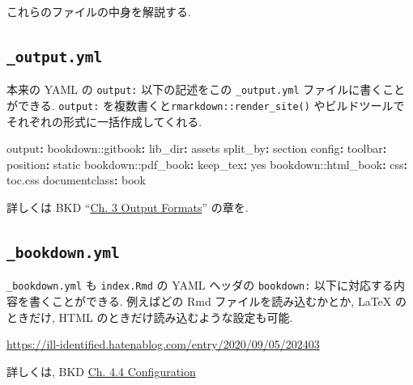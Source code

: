 \documentclass[
]{bxjsbook}
\newenvironment{Shaded}{\begin{snugshade}}{\end{snugshade}}
\newcommand{\AttributeTok}[1]{\textcolor[rgb]{0.77,0.63,0.00}{#1}}
\newcommand{\CharTok}[1]{\textcolor[rgb]{0.31,0.60,0.02}{#1}}
\newcommand{\FunctionTok}[1]{\textcolor[rgb]{0.00,0.00,0.00}{#1}}
\newcommand{\KeywordTok}[1]{\textcolor[rgb]{0.13,0.29,0.53}{\textbf{#1}}}
\theoremstyle{definition}
\theoremstyle{definition}
\theoremstyle{definition}
\theoremstyle{remark}
\begin{document}
これらのファイルの中身を解説する.

\hypertarget{output.yml}{%
\subsection{\texorpdfstring{\texttt{\_output.yml}}{\_output.yml}}\label{output.yml}}

本来の YAML の \texttt{output:} 以下の記述をこの \texttt{\_output.yml}
ファイルに書くことができる. \texttt{output:}
を複数書くと\texttt{rmarkdown::render\_site()}
やビルドツールでそれぞれの形式に一括作成してくれる.

\begin{Shaded}
\begin{Highlighting}[]
\FunctionTok{output}\KeywordTok{:}
\AttributeTok{  bookdown:}\FunctionTok{:gitbook}\KeywordTok{:}
\AttributeTok{    }\FunctionTok{lib\_dir}\KeywordTok{:}\AttributeTok{ assets}
\AttributeTok{    }\FunctionTok{split\_by}\KeywordTok{:}\AttributeTok{ section}
\AttributeTok{    }\FunctionTok{config}\KeywordTok{:}
\AttributeTok{      }\FunctionTok{toolbar}\KeywordTok{:}
\AttributeTok{        }\FunctionTok{position}\KeywordTok{:}\AttributeTok{ static}
\AttributeTok{  bookdown:}\FunctionTok{:pdf\_book}\KeywordTok{:}
\AttributeTok{    }\FunctionTok{keep\_tex}\KeywordTok{:}\AttributeTok{ }\CharTok{yes}
\AttributeTok{  bookdown:}\FunctionTok{:html\_book}\KeywordTok{:}
\AttributeTok{    }\FunctionTok{css}\KeywordTok{:}\AttributeTok{ toc.css}
\FunctionTok{documentclass}\KeywordTok{:}\AttributeTok{ book}
\end{Highlighting}
\end{Shaded}

詳しくは BKD
``\href{https://bookdown.org/yihui/bookdown/output-formats.html}{Ch. 3
Output Formats}'' の章を.

\hypertarget{bookdown.yml}{%
\subsection{\texorpdfstring{\texttt{\_bookdown.yml}}{\_bookdown.yml}}\label{bookdown.yml}}

\texttt{\_bookdown.yml} も \texttt{index.Rmd} の YAML ヘッダの
\texttt{bookdown:} 以下に対応する内容を書くことができる. 例えばどの Rmd
ファイルを読み込むかとか, LaTeX のときだけ, HTML
のときだけ読み込むような設定も可能.

\url{https://ill-identified.hatenablog.com/entry/2020/09/05/202403}

詳しくは, BKD
\href{https://bookdown.org/yihui/bookdown/configuration.html}{Ch. 4.4
Configuration}
\end{document}
